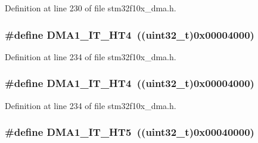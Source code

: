 Definition at line 230 of file stm32f10x\+\_\+dma.\+h.

\subsubsection[{\texorpdfstring{D\+M\+A1\+\_\+\+I\+T\+\_\+\+H\+T4}{DMA1_IT_HT4}}]{\setlength{\rightskip}{0pt plus 5cm}\#define D\+M\+A1\+\_\+\+I\+T\+\_\+\+H\+T4~(({\bf uint32\+\_\+t})0x00004000)}\hypertarget{group___d_m_a__interrupts__definition_ga1e74c117ead07f4a8749e076316cf9d0}{}\label{group___d_m_a__interrupts__definition_ga1e74c117ead07f4a8749e076316cf9d0}


Definition at line 234 of file stm32f10x\+\_\+dma.\+h.

\subsubsection[{\texorpdfstring{D\+M\+A1\+\_\+\+I\+T\+\_\+\+H\+T4}{DMA1_IT_HT4}}]{\setlength{\rightskip}{0pt plus 5cm}\#define D\+M\+A1\+\_\+\+I\+T\+\_\+\+H\+T4~(({\bf uint32\+\_\+t})0x00004000)}\hypertarget{group___d_m_a__interrupts__definition_ga1e74c117ead07f4a8749e076316cf9d0}{}\label{group___d_m_a__interrupts__definition_ga1e74c117ead07f4a8749e076316cf9d0}


Definition at line 234 of file stm32f10x\+\_\+dma.\+h.

\subsubsection[{\texorpdfstring{D\+M\+A1\+\_\+\+I\+T\+\_\+\+H\+T5}{DMA1_IT_HT5}}]{\setlength{\rightskip}{0pt plus 5cm}\#define D\+M\+A1\+\_\+\+I\+T\+\_\+\+H\+T5~(({\bf uint32\+\_\+t})0x00040000)}\hypertarget{group___d_m_a__interrupts__definition_ga3ddcb696d05b414be7a533993efa849f}{}\label{group___d_m_a__interrupts__definition_ga3ddcb696d05b414be7a533993efa849f}


